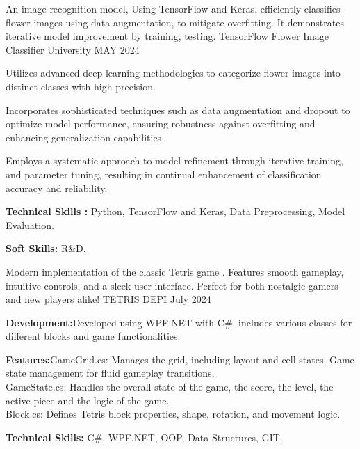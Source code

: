 \begin{cventries}
  \cventry
    {An image recognition model, Using TensorFlow and Keras, efficiently classifies flower images using data augmentation, to mitigate overfitting. It demonstrates iterative model improvement by training, testing.
    } %
    {TensorFlow Flower Image Classifier} %
    {University} %
    {MAY 2024} %
    {
      \begin{cvitems} %
        \item {Utilizes advanced deep learning methodologies to categorize flower images into distinct classes with high precision.}
        \item {Incorporates sophisticated techniques such as data augmentation and dropout to optimize model performance, ensuring robustness against overfitting and enhancing generalization capabilities.}
        \item {Employs a systematic approach to model refinement through iterative training, and parameter tuning, resulting in continual enhancement of classification accuracy and reliability.}
        \item \textbf{Technical Skills :}{ Python, TensorFlow and Keras, Data Preprocessing, Model Evaluation. }
        \item \textbf{Soft Skills: }{R\&D.}
      \end{cvitems}
    }
\end{cventries}  

\begin{cventries}
  \cventry
    {Modern implementation of the classic Tetris game . Features smooth gameplay, intuitive controls, and a sleek user interface. Perfect for both nostalgic gamers and new players alike!
} %
    {TETRIS} %
    {DEPI} %
    {July 2024} %
    {
      \begin{cvitems} %
        \item \textbf{Development:}{Developed using WPF.NET with C#. includes various classes for different blocks and game functionalities.}
        \item \textbf{Features:}{GameGrid.cs: Manages the grid, including layout and cell states. Game state management for fluid gameplay transitions.\\ GameState.cs: Handles the overall state of the game, the score, the level, the active piece and the logic of the game.\\
        Block.cs: Defines Tetris block properties, shape, rotation, and movement logic.}
        \item \textbf{Technical Skills:}{ C\#, WPF.NET, OOP, Data Structures, GIT.}
      \end{cvitems}
    }
\end{cventries}  


